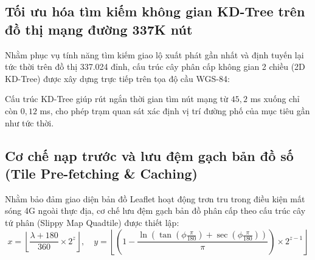\subsection{Tối ưu hóa tìm kiếm không gian KD-Tree trên đồ thị mạng đường 337K nút}

\hspace{0.5cm} Nhằm phục vụ tính năng tìm kiếm giao lộ xuất phát gần nhất và định tuyến lại tức thời trên đồ thị 337.024 đỉnh, cấu trúc cây phân cấp không gian 2 chiều (2D KD-Tree) được xây dựng trực tiếp trên tọa độ cầu WGS-84:

\begin{table}[H]
\centering
\caption{So sánh thời gian tra cứu đỉnh gần nhất giữa quét tuyến tính và cây KD-Tree}
\label{tab:kdtree-spatial-search-benchmark}
\end{table}

Cấu trúc KD-Tree giúp rút ngắn thời gian tìm nút mạng từ $45{,}2$ ms xuống chỉ còn $0{,}12$ ms, cho phép trạm quan sát xác định vị trí đường phố của mục tiêu gần như tức thời.

\subsection{Cơ chế nạp trước và lưu đệm gạch bản đồ số (Tile Pre-fetching \texorpdfstring{\&}{và} Caching)}

\hspace{0.5cm} Nhằm bảo đảm giao diện bản đồ Leaflet hoạt động trơn tru trong điều kiện mất sóng 4G ngoài thực địa, cơ chế lưu đệm gạch bản đồ phân cấp theo cấu trúc cây tứ phân (Slippy Map Quadtile) được thiết lập:
\begin{equation}
x = \left\lfloor \frac{\lambda + 180}{360} \times 2^z \right\rfloor, \quad y = \left\lfloor \left(1 - \frac{\ln(\tan(\phi \frac{\pi}{180}) + \sec(\phi \frac{\pi}{180}))}{\pi}\right) \times 2^{z-1} \right\rfloor
\label{eq:slippy-map-tile-coordinates}
\end{equation}

